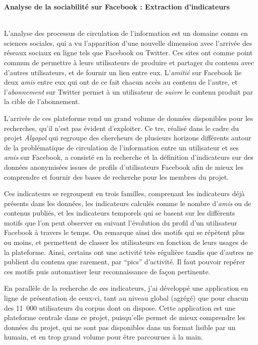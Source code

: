 \documentclass[]{article}
\author{Baptiste Fontaine}
\date{25 juin 2014}
\newcommand{\I}{\textit}
\newcommand{\q}{\enquote}
\def\fb{Facebook}
\def\twt{Twitter}
\begin{document}
\thispagestyle{empty}
\begin{center}
    \Large\textbf{Analyse de la sociabilité sur Facebook : Extraction d’indicateurs}\\
    ~\\ %
\end{center}

L’analyse des processus de circulation de l’information est un domaine connu en
sciences sociales, qui a vu l’apparition d’une nouvelle dimension avec
l’arrivée des réseaux sociaux en ligne tels que \fb{} ou \twt{}.
Ces sites ont comme point commun de permettre à leurs utilisateurs de produire
et partager du contenu avec d’autres utilisateurs, et de fournir un lien entre
eux. L’\I{amitié} sur \fb{} lie deux \I{amis} entre eux qui ont de ce fait
chacun accès au contenu de l’autre, et l’\I{abonnement} sur \twt{} permet à
un utilisateur de \I{suivre} le contenu produit par la cible de l’abonnement.

L’arrivée de ces plateforme rend un grand volume de données disponibles pour
les recherches, qu’il n’est pas évident d’exploiter. Ce {\sc tre}, réalisé dans
le cadre du projet \I{Algopol} qui regroupe des chercheurs de plusieurs
horizons différents autour de la problématique de circulation de l’information
entre un utilisateur et ses \I{amis} sur \fb{}, a consisté en la recherche et
la définition d’indicateurs sur des données anonymisées issues de profils
d’utilisateurs \fb{} afin de mieux les comprendre et fournir des bases de
recherche pour les membres du projet.

Ces indicateurs se regroupent en trois familles, comprenant les indicateurs
déjà présents dans les données, les indicateurs calculés comme le nombre
d’\I{amis} ou de contenus publiés, et les indicateurs temporels qui se basent
sur les différents motifs que l’on peut observer en suivant l’évolution du
profil d’un utilisateur \fb{} à travers le temps. On remarque ainsi des motifs
qui se répètent plus ou moins, et permettent de classer les utilisateurs en
fonction de leurs usages de la plateforme. Ainsi, certains ont une activité
très régulière tandis que d’autres ne publient du contenu que rarement, par
\q{pics} d’activité. Il faut pouvoir repérer ces motifs puis automatiser leur
reconnaissance de façon pertinente.

En parallèle de la recherche de ces indicateurs, j’ai développé une application
en ligne de présentation de ceux-ci, tant au niveau global (agrégé) que pour
chacun des 11~000 utilisateurs du corpus dont on dispose. Cette application
est une plateforme centrale dans ce projet, puisqu’elle permet de mieux
comprendre les données du projet, qui ne sont pas disponibles dans un format
lisible par un humain, et en trop grand volume pour être parcourues à la main.
\end{document}

